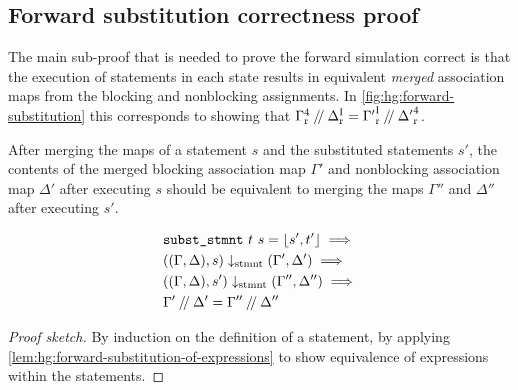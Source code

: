 \subsection{Forward substitution correctness proof}%
\label{sec:hg:forward-substitution-correctness-proof}

The main sub-proof that is needed to prove the forward simulation correct is
that the execution of statements in each state results in equivalent
\emph{merged} association maps from the blocking and nonblocking assignments.
In \cref{fig:hg:forward-substitution} this corresponds to showing that
${\Gamma}^{4}_{\mathrm r} \mathbin{/\kern-2pt/} \Delta^{\mathrm I}_{\mathrm r} =
{\Gamma'}^{\mathrm I}_{\mathrm r} \mathbin{/\kern-2pt/} {\Delta'}^4_{\mathrm r}$. 


\begin{lemma}%
  \label{lem:hg:equivalence-of-statement-subst}

  After merging the maps of a statement $s$ and the substituted statements $s'$,
  the contents of the merged blocking association map $\Gamma'$ and nonblocking
  association map $\Delta'$ after executing $s$ should be equivalent to merging
  the maps $\Gamma''$ and $\Delta''$ after executing $s'$.

  {\normalfont
    \begin{equation*}
      \begin{aligned}
        &\texttt{subst\_stmnt}\ t\ s = \lfloor s', t' \rfloor\implies\\
        &((\Gamma, \Delta), s) \downarrow_{\text{stmnt}} (\Gamma', \Delta')
          \implies\\
        &((\Gamma, \Delta), s') \downarrow_{\text{stmnt}} (\Gamma'', \Delta'')
          \implies\\
        &\Gamma' \mathbin{/\kern-2pt/} \Delta' = \Gamma'' \mathbin{/\kern-2pt/} \Delta''
      \end{aligned}
    \end{equation*}}

  \begin{proof}[Proof sketch]
    By induction on the definition of a statement, by applying
    \cref{lem:hg:forward-substitution-of-expressions} to show equivalence of
    expressions within the statements.
  \end{proof}
\end{lemma}

